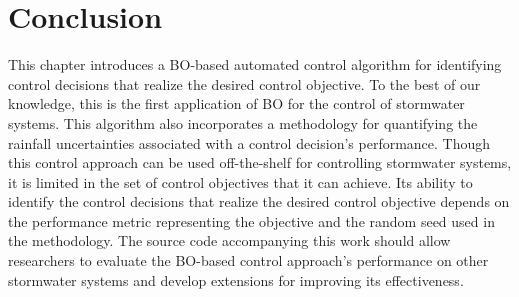 \section{Conclusion}
This chapter introduces a BO-based automated control algorithm for identifying control decisions that realize the desired control objective.
To the best of our knowledge, this is the first application of BO for the control of stormwater systems.
This algorithm also incorporates a methodology for quantifying the rainfall uncertainties associated with a control decision's performance.
Though this control approach can be used off-the-shelf for controlling stormwater systems, it is limited in the set of control objectives that it can achieve.
Its ability to identify the control decisions that realize the desired control objective depends on the performance metric representing the objective and the random seed used in the methodology.
The source code accompanying this work should allow researchers to evaluate the BO-based control approach's performance on other stormwater systems and develop extensions for improving its effectiveness.
